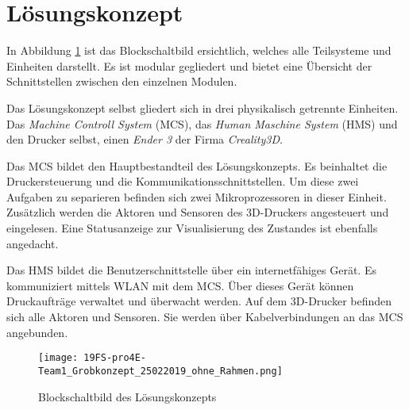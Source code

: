 \clearpage
\section{Lösungskonzept}\label{sec:Loesungskonzept}
In Abbildung \ref{img:Grobkonzept} ist das Blockschaltbild ersichtlich, welches alle Teilsysteme und Einheiten darstellt. Es ist modular gegliedert und bietet eine Übersicht der Schnittstellen zwischen den einzelnen Modulen. 

Das Lösungskonzept selbst gliedert sich in drei physikalisch getrennte Einheiten. Das \textit{Machine Controll System} (MCS), das \textit{Human Maschine System} (HMS) und den Drucker selbst, einen \textit{Ender 3} der Firma \textit{Creality3D}. 

Das MCS bildet den Hauptbestandteil des Lösungskonzepts. Es beinhaltet die Druckersteuerung und die Kommunikationsschnittstellen. Um diese zwei Aufgaben zu separieren befinden sich zwei Mikroprozessoren in dieser Einheit. Zusätzlich werden die Aktoren und Sensoren des 3D-Druckers  angesteuert und eingelesen. Eine Statusanzeige zur Visualisierung des Zustandes ist ebenfalls angedacht.

Das HMS bildet die Benutzerschnittstelle über ein internetfähiges Gerät. Es kommuniziert mittels WLAN mit dem MCS. Über dieses Gerät können Druckaufträge verwaltet und überwacht werden. Auf dem 3D-Drucker befinden sich alle Aktoren und Sensoren. Sie werden über Kabelverbindungen an das MCS angebunden.



\begin{figure}
	\centering
	\texttt{[image: 19FS-pro4E-Team1\_Grobkonzept\_25022019\_ohne\_Rahmen.png]}
	\caption{Blockschaltbild des Lösungskonzepts}
	\label{img:Grobkonzept}
\end{figure} 








